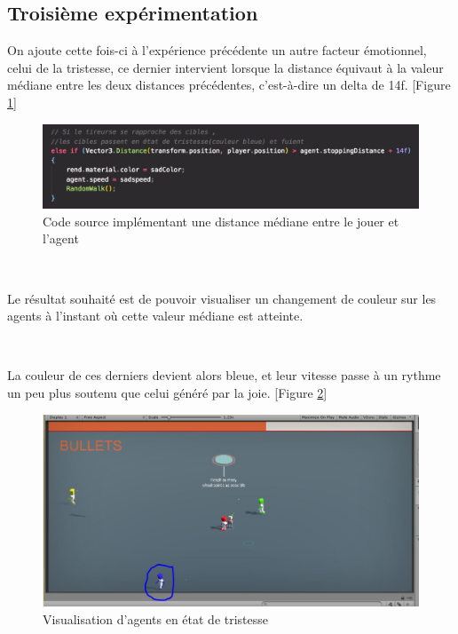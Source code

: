 \subsection{Troisième expérimentation}

On ajoute cette fois-ci à l'expérience précédente un autre facteur émotionnel, celui de la tristesse, ce dernier intervient lorsque la distance équivaut à la valeur médiane entre les deux distances précédentes, c’est-à-dire un delta de 14f. [Figure \ref{fig:333f}]


\begin{figure}[th]
\centering
\includegraphics{Figures/333f.JPG}
\decoRule
\caption[Code source implémentant une distance médiane]{Code source implémentant une distance médiane entre le jouer et l'agent}
\label{fig:333f}
\end{figure}

~\par
Le résultat souhaité est de pouvoir visualiser un changement de couleur sur les agents à l’instant où cette valeur médiane est atteinte. 


~\par
La couleur de ces derniers devient alors bleue, et leur vitesse passe à un rythme un peu plus soutenu que celui généré par la joie. [Figure \ref{fig:bichi3}]

\begin{figure}[th]
\centering
\includegraphics{Figures/bleu.JPG}
\decoRule
\caption[Visualisation d'agents en état de tristesse]{Visualisation d'agents en état de tristesse}
\label{fig:bichi3}
\end{figure}


